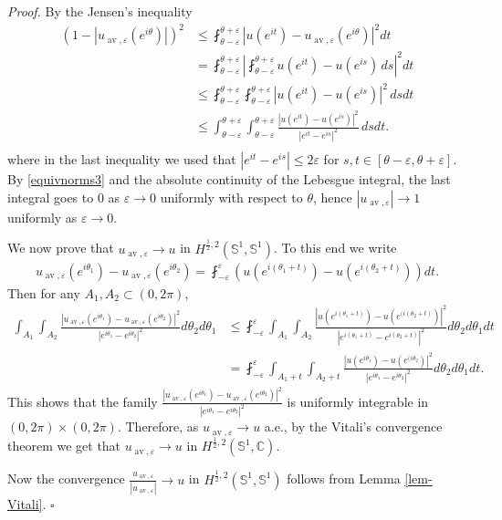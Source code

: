 \documentclass[12pt, a4paper]{article}
\newenvironment{proof}{\noindent\emph{Proof.}}{\hfill$\square$\medskip}
\newcommand{\sph}{\mathbb{S}}
\newcommand{\ve}{\varepsilon}
\renewcommand{\(}{\left(}
\renewcommand{\)}{\right)}
\DeclareMathOperator{\av}{av}
\begin{document}
\begin{proof} 
By the  Jensen's inequality
\[\begin{split}
(1-|u_{\av,\ve}(e^{i\theta})|)^2&\le\fint_{\theta-\ve}^{\theta+\ve}|u(e^{it})-u_{\av,\ve}(e^{i\theta})|^2dt\\
&=\fint_{\theta-\ve}^{\theta+\ve}\left|\fint_{\theta-\ve}^{\theta+\ve}u(e^{it})-u(e^{is})\,ds\right|^2 dt\\
&\le \fint_{\theta-\ve}^{\theta+\ve}\fint_{\theta-\ve}^{\theta+\ve}|u(e^{it})-u(e^{is})|^2\,ds dt\\
&\le \int_{\theta-\ve}^{\theta+\ve}\int_{\theta-\ve}^{\theta+\ve}\frac{|u(e^{it})-u(e^{is})|^2}{|e^{it}-e^{is}|^2}\,ds dt.\\
\end{split}\]
where in the last inequality we used that $|e^{it}-e^{is}|\le 2\ve$ for $s,t\in [\theta-\ve,\theta+\ve]$.
By \eqref{equivnorms3} and the absolute continuity of the Lebesgue integral, the last integral goes to $0$ as $\ve \to 0$ uniformly with respect to $\theta$, hence $|u_{\av,\ve}|\to 1$ uniformly as $\ve\to 0$. 

We now prove that $u_{\av,\ve} \to u$ in $H^{\frac12,2}(\sph^1,\sph^1)$. To this end we write \begin{align*} u_{\av,\ve}(e^{i\theta_1})- u_{\av,\ve}(e^{i\theta_2})=\fint_{-\ve}^\ve  \left(  u (e^{i(\theta_1+t)})-  u (e^{i(\theta_2+t)}) \right) dt.\end{align*} Then for any $A_1,A_2\subset (0,2\pi)$, \begin{align*} \int_{A_1}\int_{A_2} \frac{| u_{\av,\ve}(e^{i\theta_1})- u_{\av,\ve}(e^{i\theta_2})|^2}{|  e^{i\theta_1}-  e^{i\theta_2}|^2}d\theta_2 d\theta_1 & \leq \fint_{-\ve}^\ve \int_{A_1}\int_{A_2} \frac{|   u (e^{i(\theta_1+t)})-  u (e^{(i(\theta_2+t)})|^2}{|  e^{i(\theta_1+t)}-  e^{i(\theta_2+t)}|^2}d\theta_2 d\theta_1 dt\\ &= \fint_{-\ve}^\ve \int_{A_1+t}\int_{A_2+t} \frac{|   u (e^{i\theta_1 })-  u (e^{(i\theta_2 })|^2}{|  e^{i\theta_1 }-  e^{i\theta_2}|^2}d\theta_2 d\theta_1 dt.\end{align*} This shows that the family $ \frac{| u_{\av,\ve}(e^{i\theta_1})- u_{\av,\ve}(e^{i\theta_2})|^2}{|  e^{i\theta_1}-  e^{i\theta_2}|^2}$ is uniformly integrable in $(0,2\pi)\times(0,2\pi)$. Therefore, as $u_{\av,\ve}\to u$ a.e.,   by the Vitali's convergence theorem we get that $u_{\av,\ve}\to u$ in  $H^{\frac12,2}(\sph^1,\mathbb{C})$. 

Now the convergence $\frac{u_{\av,\ve}}{|u_{\av,\ve}|}\to u$ in  $H^{\frac12,2}(\sph^1,\sph^1)$ follows from Lemma \ref{lem-Vitali}.
\end{proof}
\end{document}
